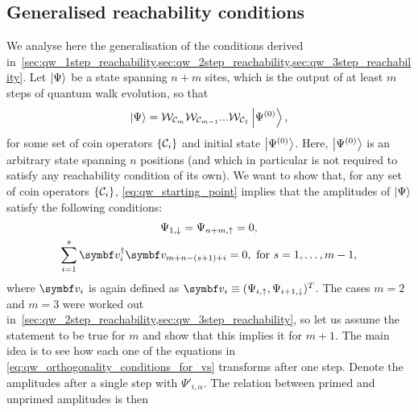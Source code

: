 \subsection{Generalised reachability conditions}
\label{sec:qw_general_reachability_conditions}

We analyse here the generalisation of the conditions derived in~\cref{sec:qw_1step_reachability,sec:qw_2step_reachability,sec:qw_3step_reachability}.
Let $\ket\Psi$ be a state spanning $n+m$ sites, which is the output of at least $m$ steps of quantum walk evolution, so that
\begin{equation}
	\ket\Psi =
	{\mathcal{W}}_{{\mathcal{C}}_{m}} {\mathcal{W}}_{{\mathcal{C}}_{m-1}} ... {\mathcal{W}}_{{\mathcal{C}}_{1}}
    \ket{\Psi^{(0)}},
	\label{eq:qw_starting_point}
\end{equation}
for some set of coin operators $\{{\mathcal{C}}_i \}$ and initial state $\ket{\Psi^{(0)}}$.
Here, $\ket{\Psi^{(0)}}$ is an arbitrary state spanning $n$ positions (and which in particular is not required to satisfy any reachability condition of its own).
We want to show that, for any set of coin operators $\{{\mathcal{C}}_i \}$, \cref{eq:qw_starting_point} implies that the amplitudes of $\ket\Psi$ satisfy the following conditions:
\begin{gather}
	\Psi_{1,\downarrow} = \Psi_{n+m, \uparrow} = 0,
    \label{eq:qw_vanishing_amplitudes}
	\\
    \sum_{i=1}^s \bs v_i^\dagger \bs v_{m+n-(s+1)+i} = 0,
	\text{ for } s=1,\ldots, m-1,
	\label{eq:qw_orthogonality_conditions_for_vs}
\end{gather}
where $\bs v_{i}$ is again defined as
$\bs v_i \equiv (\Psi_{i,\uparrow}, \Psi_{i+1, \downarrow})^T$.
The cases $m=2$ and $m=3$ were worked out in~\cref{sec:qw_2step_reachability,sec:qw_3step_reachability},
so let us assume the statement to be true for $m$ and show that this implies it for $m+1$.
The main idea is to see how each one of the equations in \cref{eq:qw_orthogonality_conditions_for_vs} transforms after one step.
Denote the amplitudes after a single step with $\Psi'_{i,\alpha}$.
The relation between primed and unprimed amplitudes is then
